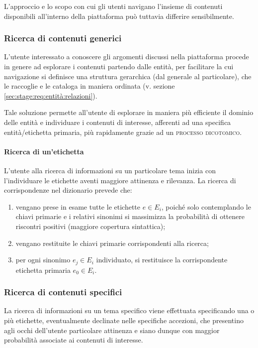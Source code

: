 \documentclass[10pt,a4paper,headinclude,footinclude,hidelinks]{scrreprt} %
\begin{document}
	L'approccio e lo scopo con cui gli utenti navigano l'insieme di contenuti disponibili all'interno della piattaforma può tuttavia differire sensibilmente.

	\subsubsection{Ricerca di contenuti generici}
	\label{sec:stage:req:ricerca:generica}
	L'utente interessato a conoscere gli argomenti discussi nella piattaforma procede in genere ad esplorare i contenuti partendo dalle entità, per facilitare la cui navigazione si definisce una struttura gerarchica (dal generale al particolare), che le raccoglie e le cataloga in maniera ordinata (v. sezione	\ref{sec:stage:req:entità:relazioni}).

	Tale soluzione permette all'utente di esplorare in maniera più efficiente il dominio delle entità e individuare i contenuti di interesse, afferenti ad una specifica entità/etichetta primaria, più rapidamente grazie ad un \textsc{processo dicotomico}.
	
	\paragraph{Ricerca di un'etichetta}
	L'utente alla ricerca di informazioni su un particolare tema inizia con l'individuare le etichette aventi maggiore attinenza e rilevanza. La ricerca di corrispondenze nel dizionario prevede che:
	\begin{enumerate}
	\item vengano prese in esame tutte le etichette $e \in E_i$, poiché solo contemplando le chiavi primarie e i relativi sinonimi si massimizza la probabilità di ottenere riscontri positivi (maggiore copertura sintattica);
	\item vengano restituite le chiavi primarie corrispondenti alla ricerca;
	\item per ogni sinonimo $e_j \in E_i$ individuato, si restituisce la corrispondente etichetta primaria $e_0 \in E_i$.
	\end{enumerate}

	\subsubsection{Ricerca di contenuti specifici}
	La ricerca di informazioni su un tema specifico viene effettuata specificando una o più etichette, eventualmente declinate nelle specifiche accezioni, che presentino agli occhi dell'utente particolare attinenza e siano dunque con maggior probabilità associate ai contenuti di interesse.
\end{document}
